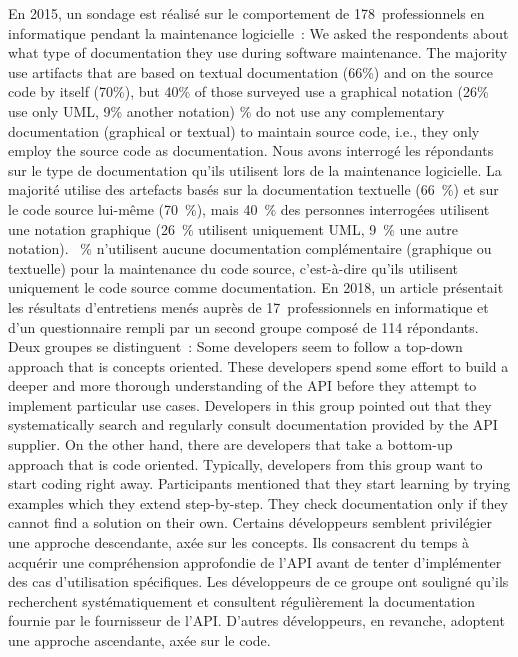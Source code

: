 {En 2015, un sondage est réalisé sur le comportement de 178~professionnels en informatique pendant la maintenance logicielle~: 
\quoteenfr
{We asked the respondents about what type of documentation they use during software maintenance. The majority use artifacts that are based on textual documentation (66\%) and on the source code by itself (70\%), but 40\% of those surveyed use a graphical notation (26\% use only UML, 9\% another notation)
 \% do not use any complementary documentation (graphical or textual) to maintain source code, i.e., they only employ the source code as documentation.}
{Nous avons interrogé les répondants sur le type de documentation qu'ils utilisent lors de la maintenance logicielle. La majorité utilise des artefacts basés sur la documentation textuelle (66~\%) et sur le code source lui-même (70~\%), mais 40~\% des personnes interrogées utilisent une notation graphique (26~\% utilisent uniquement UML, 9~\% une autre notation).
~\% n'utilisent aucune documentation complémentaire (graphique ou textuelle) pour la maintenance du code source, c'est-à-dire qu'ils utilisent uniquement le code source comme documentation.}
{\cite{fernandez_use_2015}}
En 2018, un article présentait les résultats d’entretiens menés auprès de 17~professionnels en informatique et d’un questionnaire rempli par un second groupe  composé de 114 répondants. Deux groupes se distinguent~: 
\quoteenfr
{Some developers seem to follow a top-down approach that is concepts oriented. These developers spend some effort to build a deeper and more thorough understanding of the API before they attempt to implement particular use cases.
\elide Developers in this group pointed out that they systematically search and regularly consult documentation provided by the API supplier.
\newpage
\elide On the other hand, there are developers that take a bottom-up approach that is code oriented.
\elide Typically, developers from this group want to start coding right away. Participants mentioned that they start learning by trying examples which they extend step-by-step. They check documentation only if they cannot find a solution on their own.}
{Certains développeurs semblent privilégier une approche descendante, axée sur les concepts. Ils consacrent du temps à acquérir une compréhension approfondie de l'API avant de tenter d'implémenter des cas d'utilisation spécifiques.
\elide Les développeurs de ce groupe ont souligné qu'ils recherchent systématiquement et consultent régulièrement la documentation fournie par le fournisseur de l'API.
\elide D'autres développeurs, en revanche, adoptent une approche ascendante, axée sur le code.
}}
